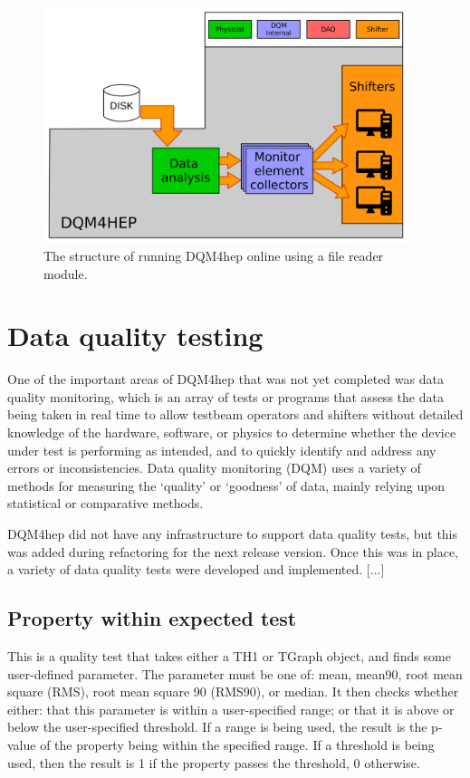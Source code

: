 \begin{figure}
	\centering
	\includegraphics[width=0.95\textwidth]{../Pictures/FileReaderModuleArchitecture.pdf}
	\caption{The structure of running DQM4hep online using a file reader module.}
	\label{figure:daq/dqm4hep/file-reader}
\end{figure}


\section{Data quality testing}
One of the important areas of DQM4hep that was not yet completed was data quality monitoring, which is an array of tests or programs that assess the data being taken in real time to allow testbeam operators and shifters without detailed knowledge of the hardware, software, or physics to determine whether the device under test is performing as intended, and to quickly identify and address any errors or inconsistencies. Data quality monitoring (DQM) uses a variety of methods for measuring the `quality' or `goodness' of data, mainly relying upon statistical or comparative methods.

DQM4hep did not have any infrastructure to support data quality tests, but this was added during refactoring for the next release version. Once this was in place, a variety of data quality tests were developed and implemented. [...]


\subsection{Property within expected test}
This is a quality test that takes either a TH1 or TGraph object, and finds some user-defined parameter. The parameter must be one of: mean, mean90, root mean square (RMS), root mean square 90 (RMS90), or median. It then checks whether either: that this parameter is within a user-specified range; or that it is above or below the user-specified threshold. If a range is being used, the result is the p-value of the property being within the specified range. If a threshold is being used, then the result is 1 if the property passes the threshold, 0 otherwise.

